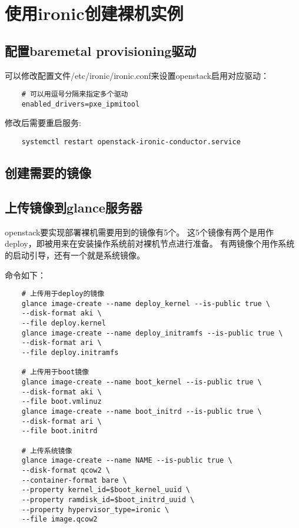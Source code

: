 \documentclass[a4paper,left=1.5cm,right=1.5cm,11pt]{article}
\begin{document}
\tableofcontents

\clearpage

\section{使用ironic创建裸机实例}
\subsection{配置baremetal provisioning驱动}
	可以修改配置文件/etc/ironic/ironic.conf来设置openstack启用对应驱动：
	\begin{lstlisting}
	# 可以用逗号分隔来指定多个驱动
	enabled_drivers=pxe_ipmitool
	\end{lstlisting}

	修改后需要重启服务:
	\begin{lstlisting}
	systemctl restart openstack-ironic-conductor.service
	\end{lstlisting}

\subsection{创建需要的镜像}

\subsection{上传镜像到glance服务器}
	openstack要实现部署裸机需要用到的镜像有5个。
	这5个镜像有两个是用作deploy，即被用来在安装操作系统前对裸机节点进行准备。
	有两镜像个用作系统的启动引导，还有一个就是系统镜像。\par

	命令如下：
	\begin{lstlisting}
	# 上传用于deploy的镜像
	glance image-create --name deploy_kernel --is-public true \
	--disk-format aki \
	--file deploy.kernel
	glance image-create --name deploy_initramfs --is-public true \
	--disk-format ari \
	--file deploy.initramfs

	# 上传用于boot镜像
	glance image-create --name boot_kernel --is-public true \
	--disk-format aki \
	--file boot.vmlinuz
	glance image-create --name boot_initrd --is-public true \
	--disk-format ari \
	--file boot.initrd

	# 上传系统镜像
	glance image-create --name NAME --is-public true \
	--disk-format qcow2 \
	--container-format bare \
	--property kernel_id=$boot_kernel_uuid \
	--property ramdisk_id=$boot_initrd_uuid \
	--property hypervisor_type=ironic \
	--file image.qcow2
	\end{lstlisting}
\end{document}
